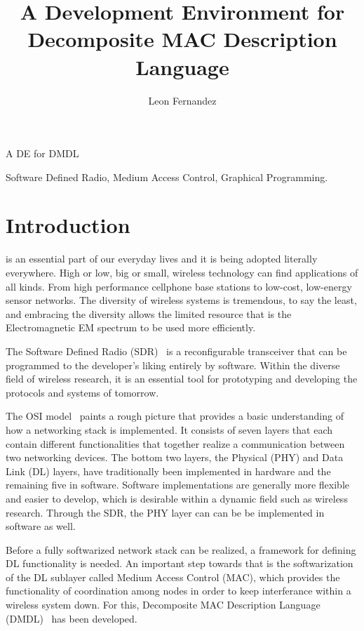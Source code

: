 \documentclass[journal,comsoc]{IEEEtran}
\begin{document}
\title{A Development Environment for Decomposite MAC Description Language}
\author{Leon Fernandez}
%
{A DE for DMDL}
\maketitle

\begin{abstract}
\end{abstract}

\begin{IEEEkeywords}
Software Defined Radio, Medium Access Control, Graphical Programming.
\end{IEEEkeywords}

\section{Introduction}
 is an essential part of our everyday lives and it is
being adopted literally everywhere. High or low, big or small, wireless technology can
find applications of all kinds. From high performance cellphone base stations to low-cost,
low-energy sensor networks. The diversity of wireless systems is tremendous, to say the least,
and embracing the diversity allows the limited resource that is the Electromagnetic EM spectrum to
be used more efficiently.

The Software Defined Radio (SDR)~\cite{sdr} is a reconfigurable transceiver that can be programmed
to the developer's liking entirely by software. Within the diverse field of wireless research,
it is an essential tool for prototyping and developing the protocols and systems of tomorrow.

The OSI model~\cite{osi} paints a rough picture that provides a basic understanding of
how a networking stack is implemented. It consists of seven layers that each contain different
functionalities that together realize a communication between two networking devices. The bottom
two layers, the Physical (PHY) and Data Link (DL) layers, have traditionally been implemented
in hardware and the remaining five in software. Software implementations are generally more
flexible and easier to develop, which is desirable within a dynamic field such as wireless
research. Through the SDR, the PHY layer can can be be implemented in software as well.

Before a fully softwarized network stack can be realized, a framework for defining DL functionality
is needed. An important step towards that is the softwarization of the DL sublayer
called Medium Access Control (MAC), which provides the functionality of coordination among nodes
in order to keep interferance within a wireless system down. For this,
Decomposite MAC Description Language (DMDL)~\cite{dmdl} has been developed.
\end{document}
